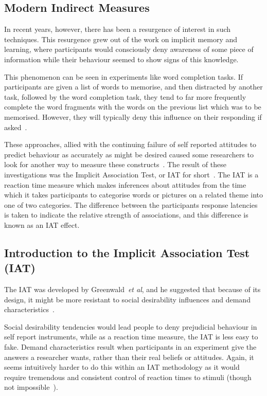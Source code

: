 \subsection{Modern Indirect Measures}
\label{sec:turn-back-indirect}
In recent years, however, there has been a resurgence of interest in such techniques. This resurgence grew out of the work on implicit memory and learning, where participants would consciously deny awareness of some piece of information while their behaviour seemed to show signs of this knowledge.  

This phenomenon can be seen in  experiments like word completion tasks. If participants are given a list of words to memorise, and then distracted by another task, followed by the word completion task, they tend to far more frequently complete the word fragments with the words on the previous list which was to be memorised.  However, they will typically deny this influence on their responding if asked~\cite{Wittenbrink2007a}. 

These approaches, allied with the continuing failure of self reported attitudes to predict behaviour as accurately as might be desired caused some researchers to look for another way to measure these constructs~\cite{Greenwald1995a}. The result of these investigations was the Implicit Association Test, or IAT for short~\cite{Greenwald1998}. The IAT is a reaction time measure which makes inferences about attitudes from the time which it takes participants to categorise words or pictures on a related theme into one of two categories. The difference between the participants response latencies is taken to indicate the relative strength of associations, and this difference is known as an IAT effect.  


\subsection{Introduction to the Implicit Association Test (IAT)}
\label{sec:intr-impl-assoc}

The IAT was developed by Greenwald~\textit{et al}, and he suggested that because of its design, it might be more resistant to social desirability influences and demand characteristics~\cite{Greenwald1998}. 

Social desirability tendencies would lead people to deny prejudicial behaviour in self report instruments, while as a reaction time measure, the IAT is less easy to fake. Demand characteristics result when participants in an experiment give the answers a researcher wants, rather than their real beliefs or attitudes. Again, it seems intuitively harder to do this within an IAT methodology as it would require tremendous and consistent control of reaction times to stimuli (though not impossible~\cite{DeHouwer2007b}). 

